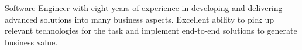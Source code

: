 

\begin{cvparagraph}

Software Engineer with eight years of experience in developing and delivering advanced solutions into many business aspects. Excellent ability to pick up relevant technologies for the task and implement end-to-end solutions to generate business value.
\end{cvparagraph}
